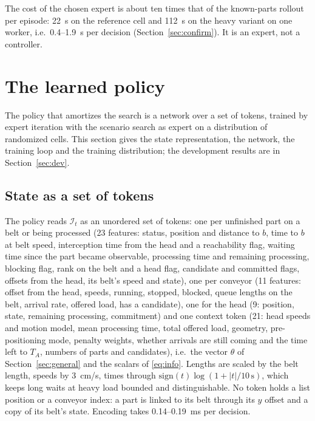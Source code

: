 \documentclass[11pt,a4paper]{article}
\theoremstyle{plain}
\theoremstyle{definition}
\theoremstyle{remark}
\newcommand{\I}{\mathcal I}
\begin{document}
The cost of the chosen expert is about ten times that of the known-parts rollout per
episode: 22~s on the reference cell and 112~s on the heavy variant on one worker, i.e.\
0.4--1.9~s per decision (Section~\ref{sec:confirm}). It is an expert, not a controller.

\section{The learned policy}\label{sec:policy}

The policy that amortizes the search is a network over a set of tokens, trained by expert iteration with the scenario search as expert on a distribution of randomized cells. This section gives the state representation, the network, the training loop and the training distribution; the development results are in Section~\ref{sec:dev}.

\subsection{State as a set of tokens}
The policy reads $\I_t$ as an unordered set of tokens: one per unfinished part on a belt
or being processed (23 features: status, position and distance to $b$, time to $b$ at belt
speed, interception time from the head and a reachability flag, waiting time since the
part became observable, processing time and remaining processing, blocking flag, rank on
the belt and a head flag, candidate and committed flags, offsets from the head, its belt's
speed and state), one per conveyor (11 features: offset from the head, speeds, running,
stopped, blocked, queue lengths on the belt, arrival rate, offered load, has a candidate),
one for the head (9: position, state, remaining processing, commitment) and one context
token (21: head speeds and motion model, mean processing time, total offered load,
geometry, pre-positioning mode, penalty weights, whether arrivals are still coming and the
time left to $T_A$, numbers of parts and candidates), i.e.\ the vector $\theta$ of
Section~\ref{sec:general} and the scalars of \eqref{eq:info}. Lengths are scaled by the
belt length, speeds by 3~cm/s, times through $\mathrm{sign}(t)\log(1+|t|/10\,\mathrm{s})$,
which keeps long waits at heavy load bounded and distinguishable. No token holds a list
position or a conveyor index: a part is linked to its belt through its $y$ offset and a
copy of its belt's state. Encoding takes 0.14--0.19~ms per decision.
\end{document}
